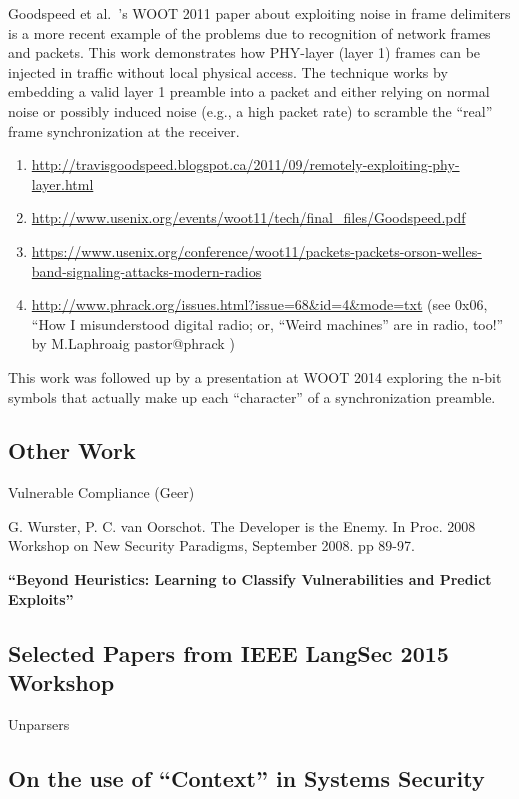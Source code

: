 \documentclass[acmcompsurv,acmnow]{acmtrans2m}
\begin{document}
Goodspeed et al.~\cite{}'s WOOT 2011 paper about exploiting noise in
frame delimiters is a more recent example of the problems due to
recognition of network frames and packets.  This work demonstrates how
PHY-layer (layer 1) frames can be injected in traffic without local
physical access.  The technique works by embedding a valid layer 1
preamble into a packet and either relying on normal noise or possibly
induced noise (e.g., a high packet rate) to scramble the ``real''
frame synchronization at the receiver.

\begin{enumerate}
  \item  \url{http://travisgoodspeed.blogspot.ca/2011/09/remotely-exploiting-phy-layer.html}
  \item  \url{http://www.usenix.org/events/woot11/tech/final_files/Goodspeed.pdf}
  \item  \url{https://www.usenix.org/conference/woot11/packets-packets-orson-welles-band-signaling-attacks-modern-radios}
  \item \url{http://www.phrack.org/issues.html?issue=68&id=4&mode=txt} 
    (see 0x06, ``How I misunderstood digital radio; or, ``Weird machines'' are in radio, too!'' by M.Laphroaig pastor@phrack )
\end{enumerate}

This work was followed up by a presentation at WOOT 2014 exploring the
n-bit symbols that actually make up each ``character'' of a
synchronization preamble.

\subsection{Other Work}

Vulnerable Compliance (Geer)

G. Wurster, P. C. van Oorschot. The Developer is the Enemy. In
Proc. 2008 Workshop on New Security Paradigms, September 2008. pp
89-97.

{\bf ``Beyond Heuristics: Learning to Classify Vulnerabilities and Predict Exploits''}


\subsection{Selected Papers from IEEE LangSec 2015 Workshop}

Unparsers


\subsection{On the use of ``Context'' in Systems Security}
\end{document}
